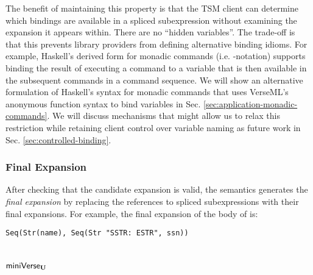 The benefit of maintaining this property is that the TSM client can determine which bindings are available in a spliced subexpression without examining the expansion it appears within. There are no ``hidden variables''. The trade-off is that this prevents library providers from defining  alternative binding idioms. For example, Haskell's derived form for monadic commands (i.e. -notation) supports binding the result of executing a command to a variable that is then available in the subsequent commands in a command sequence. We will show an alternative formulation of Haskell's syntax for monadic commands that uses VerseML's anonymous function syntax to bind variables in Sec. \ref{sec:application-monadic-commands}. We will discuss mechanisms that might allow us to relax this restriction while retaining client control over variable naming as future work in Sec. \ref{sec:controlled-binding}.


\subsubsection{Final Expansion}
After checking that the candidate expansion is {valid}, the semantics generates the \emph{final expansion} by replacing the references to spliced subexpressions with their final expansions. For example, the final expansion of the body of  is:
\begin{lstlisting}[numbers=none]
Seq(Str(name), Seq(Str "SSTR: ESTR", ssn))
\end{lstlisting}



\section{$\mathsf{miniVerse}_\textbf{U}$}\label{sec:tsms-minimal-formalism}

